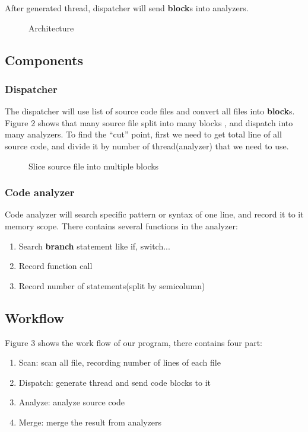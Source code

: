 \documentclass{acm_proc_article-sp}
\begin{document}
	After generated thread, 
	dispatcher will send \textbf{block}s into analyzers.

\begin{figure}
	\centering
	\caption{Architecture}
\end{figure}


\subsection{Components}
\subsubsection{Dispatcher}
	The dispatcher will use list of source code files and convert all files into
	\textbf{block}s. Figure 2 shows that many source file split into many blocks
	, and dispatch into many analyzers. To find the ``cut'' point, first we need to 
	get total line of all source code, and divide it by number of thread(analyzer)
	that we need to use.
\begin{figure}
	\centering
	\caption{Slice source file into multiple blocks}
\end{figure}
\subsubsection{Code analyzer}
	Code analyzer will search specific pattern or syntax of one line, and record 
	it to it memory scope. There contains several functions in the analyzer:
	\begin{enumerate}
		\item Search \textbf{branch} statement like if, switch...
		\item Record function call
		\item Record number of statements(split by semicolumn)
	\end{enumerate}
	
\subsection{Workflow}
	Figure 3 shows the work flow of our program, there contains four part:
	\begin{enumerate}
		\item Scan: scan all file, recording number of lines of each file
		\item Dispatch: generate thread and send code blocks to it
		\item Analyze: analyze source code
		\item Merge: merge the result from analyzers
	\end{enumerate}
\end{document}
